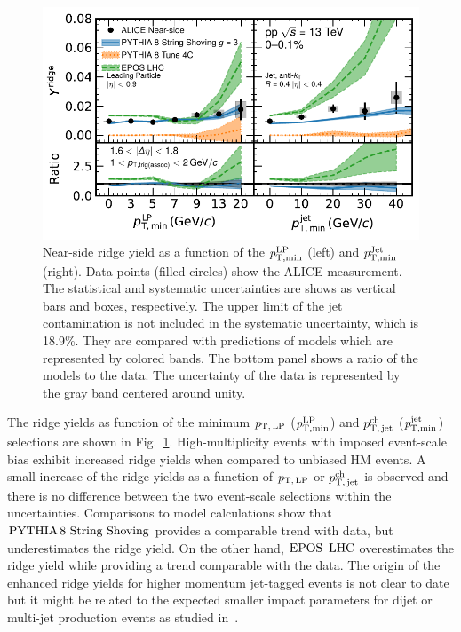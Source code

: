 
\begin{figure}[h!]
	\centering
	\includegraphics[width=0.89\linewidth]{./figures/Fig6_RidgeYieldESE.pdf}
	\caption{Near-side ridge yield as a function of the $\it{p}^{\rm{LP}}_{\rm{T,min}}$ (left) and $\it{p}^{\rm{Jet}}_{\rm{T,min}}$ (right). Data points (filled circles) show the ALICE measurement. The statistical and systematic uncertainties are shows as vertical bars and boxes, respectively. The upper limit of the jet contamination is not included in the  systematic uncertainty, which is 18.9\%. They are compared with predictions of models which are represented by colored bands. The bottom panel shows a ratio of the models to the data. The uncertainty of the data is represented by the gray band centered around unity.}
	\label{fig:RidgeYield_ESE}
\end{figure}

The ridge yields as function of the minimum $p_\mathrm{T,\,LP}$ ($\it{p}^{\rm{LP}}_{\rm{T,min}}$) and $p_\mathrm{T,\,jet}^\mathrm{ch}$ ($\it{p}^{\rm{jet}}_{\rm{T,min}}$) selections are shown in Fig.~\ref{fig:RidgeYield_ESE}. High-multiplicity events with imposed event-scale bias exhibit increased ridge yields when compared to unbiased HM events. A small increase of the ridge yields as a function of $p_\mathrm{T,\,LP}$ or $p_\mathrm{T,\,jet}^\mathrm{ch}$ is observed and there is no difference between the two event-scale selections within the uncertainties. Comparisons to model calculations show that ${\mathrm{PYTHIA}\,8~\mathrm{String}~}\mathrm{Shoving}$ provides a comparable trend with data, but underestimates the ridge yield. On the other hand, ${\mathrm{EPOS}\,~\mathrm{LHC}}$ overestimates the ridge yield while providing a trend comparable with the data. The origin of the enhanced ridge yields for higher momentum jet-tagged events is not clear to date but it might be related to the expected smaller impact parameters for dijet or multi-jet production events as studied in~\cite{Frankfurt:2010ea}.

